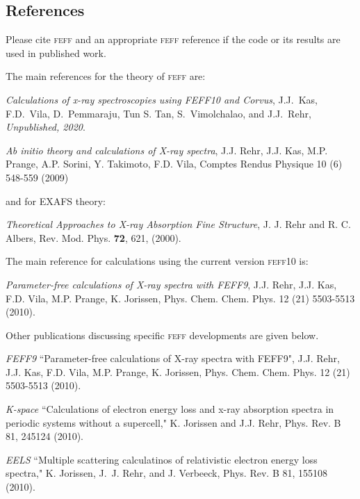 \documentclass[11pt,oneside]{report} %
\newcommand{\feffcurrent}{\textsc{feff10}}
\newcommand{\program}[1]{\textsc{#1}}
\newcommand{\feff}{\program{feff}}
\begin{document}
\begin{latexonly}

\chapter{References}
\label{sec:Append-C-Refer}


Please cite {\feff} and an appropriate {\feff} reference if the code or its results are used in published work. 

The main references for the theory of {\feff} are:

\emph{Calculations of x-ray spectroscopies using FEFF10 and Corvus},
J.J.\ Kas, F.D.\ Vila, D.\ Pemmaraju, Tun S. Tan, S.\ Vimolchalao,
and J.J.\ Rehr, {\it Unpublished, 2020}.

\emph{Ab initio theory and calculations of X-ray spectra},
 J.J. Rehr, J.J. Kas, M.P. Prange, A.P. Sorini, Y. Takimoto, F.D. Vila, Comptes Rendus Physique 10 (6) 548-559 (2009)
 
and for EXAFS theory:

\emph{Theoretical Approaches to X-ray Absorption Fine Structure},
J. J. Rehr and R. C. Albers, Rev. Mod. Phys. {\bf72}, 621, (2000).
 

The main reference for calculations using the current version {\feffcurrent}  is:

\emph{Parameter-free calculations of X-ray spectra with FEFF9}, J.J. Rehr, J.J. Kas, F.D. Vila, M.P. Prange, K. Jorissen, Phys. Chem. Chem. Phys. 12 (21) 5503-5513 (2010).


\medskip
\medskip
Other publications discussing specific {\feff} developments are given below.

\begin{Reflist}

\item [\textit{FEFF9}]  ``Parameter-free calculations of X-ray spectra with FEFF9", J.J. Rehr, J.J. Kas, F.D. Vila, M.P. Prange, K. Jorissen, Phys. Chem. Chem. Phys. 12 (21) 5503-5513 (2010).

\item [\textit{K-space}]  ``Calculations of electron energy loss and x-ray absorption spectra in periodic systems without
a supercell," K. Jorissen and J.J. Rehr, Phys. Rev. B 81, 245124 (2010).

\item [\textit{EELS}] ``Multiple scattering calculatinos of relativistic electron
energy loss spectra," K. Jorissen, J.~J. Rehr, and J. Verbeeck,
 Phys. Rev. B 81, 155108 (2010).


\end{Reflist}
\end{latexonly}
\end{document}
